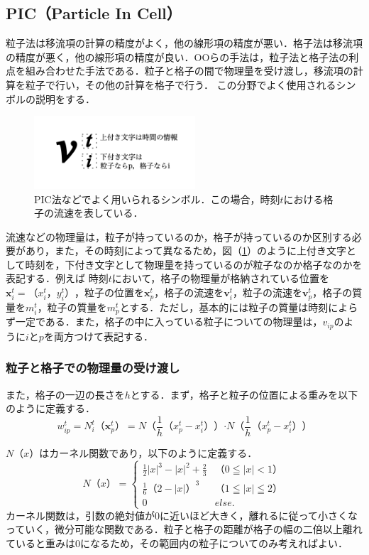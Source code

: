 \documentclass[a4j,12pt]{jreport}
\begin{document}
\subsection{PIC（Particle In Cell）} \label{subsec:PIC}
粒子法は移流項の計算の精度がよく，他の線形項の精度が悪い．格子法は移流項の精度が悪く，他の線形項の精度が良い．OOらの手法は，粒子法と格子法の利点を組み合わせた手法である．粒子と格子の間で物理量を受け渡し，移流項の計算を粒子で行い，その他の計算を格子で行う．
この分野でよく使用されるシンボルの説明をする．
\begin{figure}[htbp]
\begin{center}
\includegraphics[width=60mm]{exp_simbol.png}
\end{center}
\caption{PIC法などでよく用いられるシンボル．この場合，時刻$t$における格子の流速を表している．}
\label{fig:simbol}
\end{figure}

流速などの物理量は，粒子が持っているのか，格子が持っているのか区別する必要があり，また，その時刻によって異なるため，図（\ref{fig:simbol}）のように上付き文字として時刻を，下付き文字として物理量を持っているのが粒子なのか格子なのかを表記する．例えば
時刻$t$において，格子の物理量が格納されている位置を$\bm{x}^t_i = （x^t_i，y^t_i）$，粒子の位置を$\bm{x}^t_p$，格子の流速を$\bm{v}^t_i$，粒子の流速を$\bm{v}^t_p$，格子の質量を$m^t_i$，粒子の質量を$m^t_p$とする．ただし，基本的には粒子の質量は時刻によらず一定である．また，格子の中に入っている粒子についての物理量は，$v_{ip}$のように$iとp$を両方つけて表記する．
\subsubsection{粒子と格子での物理量の受け渡し} \label{subsec:P2GG2P}
また，格子の一辺の長さを$h$とする．まず，格子と粒子の位置による重みを以下のように定義する．
\begin{equation}\label{eq:weight}
w^t_{ip} = N^t_i（\bm{x}^t_p） = N（\frac{1}{h}（x^t_p - x^t_i））\boldsymbol{\cdot}N（\frac{1}{h}（x^t_p - x^t_i））
\end{equation} 

$N（x）$はカーネル関数であり，以下のように定義する．
\begin{equation}\label{eq:kernel}
N（x） = 
\begin{cases}
\frac{1}{2}|x|^3 - |x|^2 + \frac{2}{3} & （0\leqq|x|<1） \\
\frac{1}{6}（2-|x|）^3 & （1\leqq|x|\leqq2） \\
0 & else.
\end{cases}
\end{equation} 
カーネル関数は，引数の絶対値が0に近いほど大きく，離れるに従って小さくなっていく，微分可能な関数である．粒子と格子の距離が格子の幅の二倍以上離れていると重みは0になるため，その範囲内の粒子についてのみ考えればよい．
\end{document}

